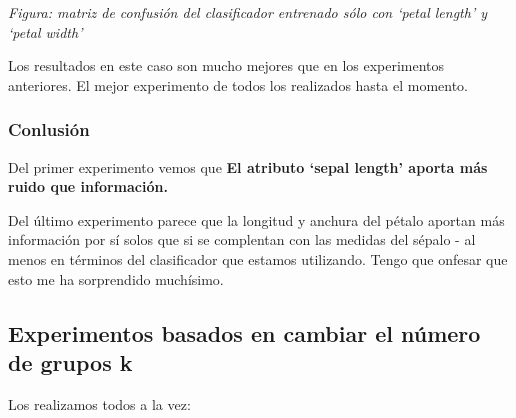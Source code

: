 \documentclass[11pt]{article}
\begin{document}
            \endgroup
    \emph{Figura: matriz de confusión del clasificador entrenado sólo con
`petal length' y `petal width'}

Los resultados en este caso son mucho mejores que en los experimentos
anteriores. El mejor experimento de todos los realizados hasta el
momento.

    \subsubsection{Conlusión}\label{conlusiuxf3n}

Del primer experimento vemos que \textbf{El atributo `sepal length'
aporta más ruido que información.}

Del último experimento parece que la longitud y anchura del pétalo
aportan más información por sí solos que si se complentan con las
medidas del sépalo - al menos en términos del clasificador que estamos
utilizando. Tengo que onfesar que esto me ha sorprendido muchísimo.

\subsection{Experimentos basados en cambiar el número de grupos
k}\label{experimentos-basados-en-cambiar-el-nuxfamero-de-grupos-k}

Los realizamos todos a la vez:
\end{document}
